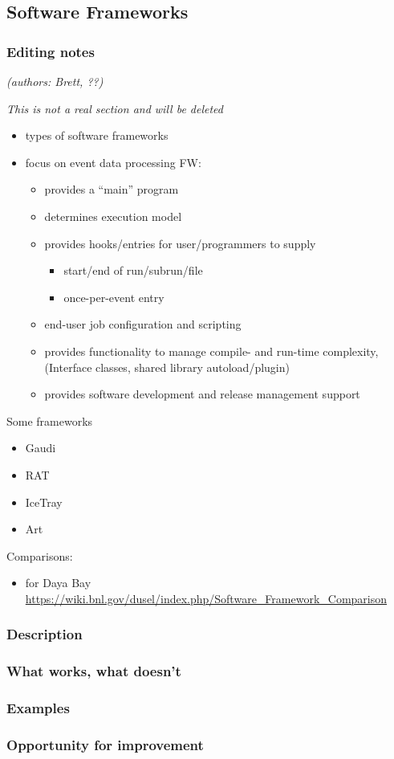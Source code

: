 \subsection{Software Frameworks}
\subsubsection{Editing notes}

\textit{(authors: Brett, ??)}

\textit{This is not a real section and will be deleted}

\begin{itemize}
\item types of software frameworks
\item focus on event data processing FW:
  \begin{itemize}
  \item provides a ``main'' program
  \item determines execution model
  \item provides hooks/entries for user/programmers to supply
    \begin{itemize}
    \item start/end of run/subrun/file
    \item once-per-event entry
    \end{itemize}
  \item end-user job configuration and scripting
  \item provides functionality to manage compile- and run-time complexity, (Interface classes, shared library autoload/plugin)
  \item provides software development and release management support
  \end{itemize}
\end{itemize}
Some frameworks
\begin{itemize}
\item Gaudi
\item RAT
\item IceTray
\item Art
\end{itemize}
Comparisons:
\begin{itemize}
\item for Daya Bay \url{https://wiki.bnl.gov/dusel/index.php/Software_Framework_Comparison}
\end{itemize}

\subsubsection{Description}
\subsubsection{What works, what doesn't}
\subsubsection{Examples}
\subsubsection{Opportunity for improvement}
